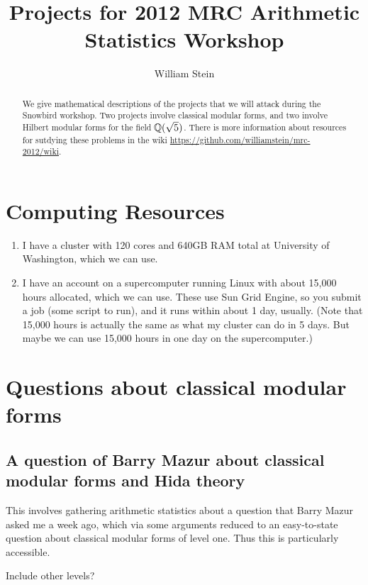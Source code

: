 \documentclass{article}
\title{Projects for 2012 MRC Arithmetic Statistics Workshop}
\author{William Stein}
\begin{document}
\maketitle
\begin{abstract}
  We give mathematical descriptions of the projects that we will
  attack during the Snowbird workshop.  Two projects involve classical
  modular forms, and two involve Hilbert modular forms for the field
  $\mathbb{Q}(\sqrt{5})$. There is more information about resources for
  sutdying these problems in the wiki
  \url{https://github.com/williamstein/mrc-2012/wiki}.
\end{abstract}

\tableofcontents

\section*{Computing Resources}

\begin{enumerate}
\item I have a cluster with 120 cores and 640GB RAM total at
  University of Washington, which we can use.  

\item I have an account on a supercomputer running Linux with about
  15,000 hours allocated, which we can use.  These use Sun Grid
  Engine, so you submit a job (some script to run), and it runs within
  about 1 day, usually.  (Note that 15,000 hours is actually the same
  as what my cluster can do in 5 days.  But maybe we can use 15,000 hours in one day on the supercomputer.)
\end{enumerate}


\section{Questions about classical modular forms}
\subsection{A question of Barry Mazur about classical modular forms and Hida theory}

This involves gathering arithmetic statistics about a question that
Barry Mazur asked me a week ago, which via some arguments reduced to 
an easy-to-state question about classical modular forms of level one.
Thus this is particularly accessible.


Include other levels?

\end{document}
